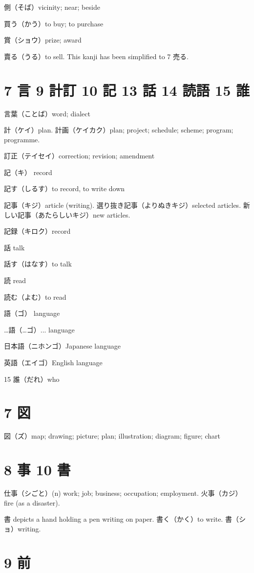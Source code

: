 側（そば）vicinity; near; beside

買う（かう）to buy; to purchase

賞（ショウ）prize; award

賣る（うる）to sell.
This kanji has been simplified to 7 売る.

\section{7 言 9 計訂 10 記 13 話 14 読語 15 誰}

言葉（ことば）word; dialect

計（ケイ）plan.
計画（ケイカク）plan; project; schedule; scheme; program; programme.

訂正（テイセイ）correction; revision; amendment

記（キ） record

記す（しるす）to record, to write down

記事（キジ）article (writing).
選り抜き記事（よりぬきキジ）selected articles.
新しい記事（あたらしいキジ）new articles.

記録（キロク）record

話 talk

話す（はなす）to talk

読 read

読む（よむ）to read

語（ゴ） language

…語（…ゴ）... language

日本語（ニホンゴ）Japanese language

英語（エイゴ）English language

15 誰（だれ）who

\section{7 図}

図（ズ）map; drawing; picture; plan; illustration; diagram; figure; chart

\section{8 事 10 書}

仕事（シごと）(n) work; job; business; occupation; employment.
火事（カジ）fire (as a disaster).

書 depicts a hand holding a pen writing on paper.
書く（かく）to write.
書（ショ）writing.

\section{9 前}

